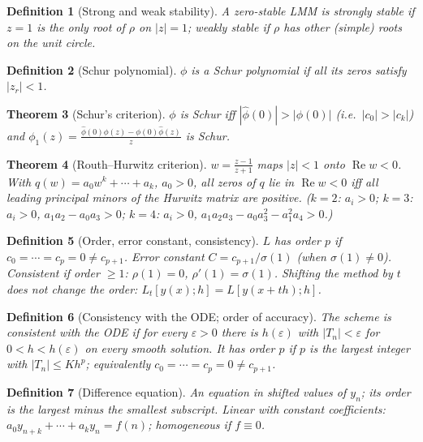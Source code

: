 \documentclass[10pt,a4paper]{article}
\theoremstyle{tight}
\newtheorem{theorem}{Theorem}[section]
\newtheorem{definition}[theorem]{Definition}
\begin{document}
\begin{definition}[Strong and weak stability]
A zero-stable LMM is strongly stable if \(z=1\) is the only root of \(\rho\) on \(|z|=1\);
weakly stable if \(\rho\) has other (simple) roots on the unit circle.
\end{definition}

\begin{definition}[Schur polynomial]
\(\phi\) is a Schur polynomial if all its zeros satisfy \(|z_r|<1\).
\end{definition}

\begin{theorem}[Schur's criterion]
\(\phi\) is Schur iff \(|\hat\phi(0)|>|\phi(0)|\) (i.e.\ \(|c_0|>|c_k|\)) and
\(\phi_1(z)=\frac{\hat\phi(0)\phi(z)-\phi(0)\hat\phi(z)}z\) is Schur.
\end{theorem}

\begin{theorem}[Routh--Hurwitz criterion]
\(w=\frac{z-1}{z+1}\) maps \(|z|<1\) onto \(\operatorname{Re}w<0\). With
\(q(w)=a_0w^k+\cdots+a_k\), \(a_0>0\), all zeros of \(q\) lie in \(\operatorname{Re}w<0\) iff all
leading principal minors of the Hurwitz matrix are positive. (\(k=2\): \(a_i>0\);
\(k=3\): \(a_i>0\), \(a_1a_2-a_0a_3>0\); \(k=4\): \(a_i>0\), \(a_1a_2a_3-a_0a_3^2-a_1^2a_4>0\).)
\end{theorem}

\begin{definition}[Order, error constant, consistency]
\(L\) has order \(p\) if \(c_0=\cdots=c_p=0\ne c_{p+1}\). Error constant \(C=c_{p+1}/\sigma(1)\)
(when \(\sigma(1)\ne0\)). Consistent if order \(\ge1\): \(\rho(1)=0\), \(\rho'(1)=\sigma(1)\).
Shifting the method by \(t\) does not change the order: \(L_t[y(x);h]=L[y(x+th);h]\).
\end{definition}

\begin{definition}[Consistency with the ODE; order of accuracy]
The scheme is consistent with the ODE if for every \(\varepsilon>0\) there is \(h(\varepsilon)\) with
\(|T_n|<\varepsilon\) for \(0<h<h(\varepsilon)\) on every smooth solution. It has order \(p\) if
\(p\) is the largest integer with \(|T_n|\le Kh^p\); equivalently \(c_0=\cdots=c_p=0\ne c_{p+1}\).
\end{definition}

\begin{definition}[Difference equation]
An equation in shifted values of \(y_n\); its order is the largest minus the smallest subscript.
Linear with constant coefficients: \(a_0y_{n+k}+\cdots+a_ky_n=f(n)\); homogeneous if \(f\equiv0\).
\end{definition}
\end{document}
